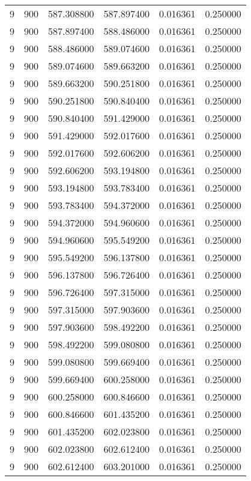 \begin{longtable}{rrrrrr}
9 & 900 & 587.308800 & 587.897400 & 0.016361 & 0.250000 \\
9 & 900 & 587.897400 & 588.486000 & 0.016361 & 0.250000 \\
9 & 900 & 588.486000 & 589.074600 & 0.016361 & 0.250000 \\
9 & 900 & 589.074600 & 589.663200 & 0.016361 & 0.250000 \\
9 & 900 & 589.663200 & 590.251800 & 0.016361 & 0.250000 \\
9 & 900 & 590.251800 & 590.840400 & 0.016361 & 0.250000 \\
9 & 900 & 590.840400 & 591.429000 & 0.016361 & 0.250000 \\
9 & 900 & 591.429000 & 592.017600 & 0.016361 & 0.250000 \\
9 & 900 & 592.017600 & 592.606200 & 0.016361 & 0.250000 \\
9 & 900 & 592.606200 & 593.194800 & 0.016361 & 0.250000 \\
9 & 900 & 593.194800 & 593.783400 & 0.016361 & 0.250000 \\
9 & 900 & 593.783400 & 594.372000 & 0.016361 & 0.250000 \\
9 & 900 & 594.372000 & 594.960600 & 0.016361 & 0.250000 \\
9 & 900 & 594.960600 & 595.549200 & 0.016361 & 0.250000 \\
9 & 900 & 595.549200 & 596.137800 & 0.016361 & 0.250000 \\
9 & 900 & 596.137800 & 596.726400 & 0.016361 & 0.250000 \\
9 & 900 & 596.726400 & 597.315000 & 0.016361 & 0.250000 \\
9 & 900 & 597.315000 & 597.903600 & 0.016361 & 0.250000 \\
9 & 900 & 597.903600 & 598.492200 & 0.016361 & 0.250000 \\
9 & 900 & 598.492200 & 599.080800 & 0.016361 & 0.250000 \\
9 & 900 & 599.080800 & 599.669400 & 0.016361 & 0.250000 \\
9 & 900 & 599.669400 & 600.258000 & 0.016361 & 0.250000 \\
9 & 900 & 600.258000 & 600.846600 & 0.016361 & 0.250000 \\
9 & 900 & 600.846600 & 601.435200 & 0.016361 & 0.250000 \\
9 & 900 & 601.435200 & 602.023800 & 0.016361 & 0.250000 \\
9 & 900 & 602.023800 & 602.612400 & 0.016361 & 0.250000 \\
9 & 900 & 602.612400 & 603.201000 & 0.016361 & 0.250000 \\

\end{longtable}
